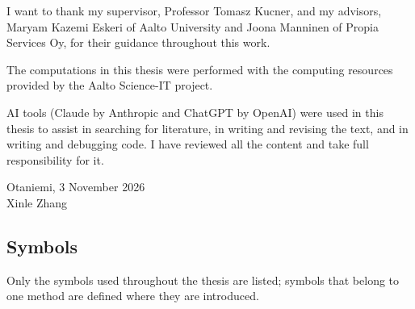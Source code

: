 \documentclass[english, 12pt, a4paper, elec, utf8, a-2b, online]{aaltothesis}
\begin{document}




\dothesispagenumbering{}

I want to thank my supervisor, Professor Tomasz Kucner, and my advisors, Maryam Kazemi Eskeri of Aalto University and Joona Manninen of Propia Services Oy, for their guidance throughout this work.

The computations in this thesis were performed with the computing resources provided by the Aalto Science-IT project.

AI tools (Claude by Anthropic and ChatGPT by OpenAI) were used in this thesis to assist in searching for literature, in writing and revising the text, and in writing and debugging code. I have reviewed all the content and take full responsibility for it.

\vspace{5cm}
Otaniemi, 3 November 2026\\

\vspace{5mm}
{\hfill Xinle Zhang \hspace{1cm}}

\newpage

\thesistableofcontents


\subsection*{Symbols}

Only the symbols used throughout the thesis are listed; symbols that belong to
one method are defined where they are introduced.
\end{document}

